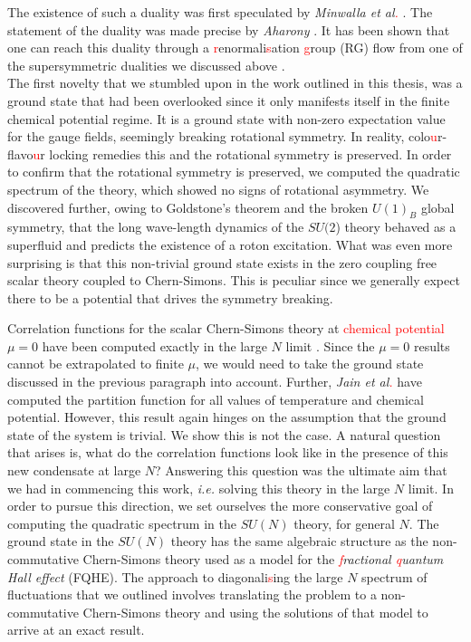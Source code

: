 The existence of such a duality was first speculated by \textit{Minwalla et al\textcolor{red}{.}} \cite{Giombi:2011kc}. The statement of the duality was made precise by \textit{Aharony} \cite{Aharony:2015mjs}.  It has been shown that one can reach this duality through a \textcolor{red}{r}enormali\textcolor{red}{s}ation \textcolor{red}{g}roup (RG) flow from one of the supersymmetric dualities we discussed above \cite{Gur-Ari:2015pca}.\\

The first novelty that we stumbled upon in the work outlined in this thesis, was a ground state that had been overlooked since it only manifests itself in the finite chemical potential regime. It is a ground state with non-zero expectation value for the gauge fields, seemingly breaking rotational symmetry. In reality, colo\textcolor{red}{u}r-flavo\textcolor{red}{u}r locking remedies this and the rotational symmetry is preserved. In order to confirm that the rotational symmetry is preserved, we computed the quadratic spectrum of the theory, which showed no signs of rotational asymmetry. We discovered further, owing to Goldstone's theorem and the broken $U(1)_B$ global symmetry, that the long wave-length dynamics of the $SU(2$) theory behaved as a superfluid and predicts the existence of a roton excitation. What was even more surprising is that this non-trivial ground state exists in the zero coupling free scalar theory coupled to Chern-Simons. This is peculiar since we generally expect there to be a potential that drives the symmetry breaking.

Correlation functions for the scalar Chern-Simons theory at \textcolor{red}{chemical potential} $\mu=0$ have been computed exactly in the large $N$ limit \cite{Aharony:2012nh}. Since the $\mu =0$ results cannot be extrapolated to finite $\mu$, we would need to take the ground state discussed in the previous paragraph into account. Further, \textit{Jain et al\textcolor{red}{.}} \cite{Jain:2013gza} have computed the partition function for all values of temperature and chemical potential. However, this result again hinges on the assumption that the ground state of the system is trivial. We show this is not the case. A natural question that arises is, what do the correlation functions look like in the presence of this new condensate at large $N$? Answering this question was the ultimate aim that we had in commencing this work, \textit{i.e.} solving this theory in the large $N$ limit. In order to pursue this direction, we set ourselves the more conservative goal of computing the quadratic spectrum in the $SU(N)$ theory, for general $N$. The ground state in the $SU(N)$ theory has the same algebraic structure as the non-commutative Chern-Simons theory used as a model for the \textit{\textcolor{red}{f}ractional \textcolor{red}{q}uantum Hall effect} (FQHE). The approach to diagonali\textcolor{red}{s}ing the large $N$ spectrum of fluctuations that we outlined involves translating the problem to a non-commutative Chern-Simons theory and using the solutions of that model to arrive at an exact result.

